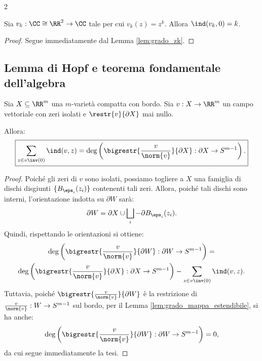 \begin{multicols*}{2}
    \begin{corollary}[Indice di $z^k$ in $0$]
        Sia $v_k : \CC \cong \RR^2 \to \CC$ tale per cui
        $v_k(z) = z^k$. Allora $\ind(v_k, 0) = k$.
    \end{corollary}

    \begin{proof}
        Segue immediatamente dal Lemma \ref{lem:grado_zk}.
    \end{proof}

    \subsection{Lemma di Hopf e teorema fondamentale dell'algebra}

    \begin{lemma}[di Hopf] \label{lem:hopf}
        Sia $X \subseteq \RR^m$ una $m$-varietà compatta con bordo. Sia
        $v : X \to \RR^m$ un campo vettoriale con zeri isolati e $\restr{v}{\partial X}$
        mai nullo. \smallskip

        Allora:
        \[
            \boxed{\sum_{z \in v\inv(0)} \ind(v, z) = \deg\left(\bigrestr{\frac{v}{\norm{v}}}{\partial X} : \partial X \to S^{m-1} \right).}
        \]
    \end{lemma}

    \begin{proof}
        Poiché gli zeri di $v$ sono isolati, possiamo togliere a $X$ una famiglia di dischi disgiunti $\{B_{\eps_i}(z_i)\}$ contenenti tali zeri.
        Allora, poiché tali dischi sono interni, l'orientazione indotta su $\partial W$ sarà:
        \[
            \partial W = \partial X \cup \bigsqcup_i -\partial B_{\eps_i}(z_i).
        \]
        Quindi, rispettando le orientazioni si ottiene:
        \begin{multline*}
            \deg\left(\bigrestr{\frac{v}{\norm{v}}}{\partial W} : \partial W \to S^{m-1} \right) = \\
            \deg\left(\bigrestr{\frac{v}{\norm{v}}}{\partial X} : \partial X \to S^{m-1} \right) - \sum_{z \in v\inv(0)} \ind(v, z).
        \end{multline*}
        Tuttavia, poiché $\bigrestr{\frac{v}{\norm{v}}}{\partial W}$ è la restrizione di $\frac{v}{\norm{v}} : W \to S^{m-1}$ sul bordo, per il Lemma
        \ref{lem:grado_mappa_estendibile}, si ha anche:
        \[
            \deg\left(\bigrestr{\frac{v}{\norm{v}}}{\partial W} : \partial W \to S^{m-1} \right) = 0,
        \]
        da cui segue immediatamente la tesi.
    \end{proof}


\end{multicols*}
